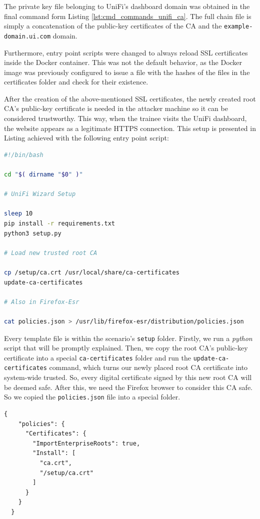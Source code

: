 The private key file belonging to UniFi's dashboard domain was obtained in the final command form Listing \ref{lst:cmd_commands_unifi_ca}. The full chain file is simply a concatenation of the public-key certificates of the CA and the \texttt{example-domain.ui.com} domain. 

Furthermore, entry point scripts were changed to always reload SSL certificates inside the Docker container. This was not the default behavior, as the Docker image was previously configured to issue a file with the hashes of the files in the certificates folder and check for their existence.


After the creation of the above-mentioned SSL certificates, the newly created root CA's public-key certificate is needed in the attacker machine so it can be considered trustworthy. This way, when the trainee visits the UniFi dashboard, the website appears as a legitimate HTTPS connection. This setup is presented in Listing  achieved with the following entry point script:

\begin{lstlisting}[language=bash,caption=Entrypoint Bash Script.,numbers=none,label={lst:log4j_entrypoint_script}]
#!/bin/bash

cd "$( dirname "$0" )"

# UniFi Wizard Setup 

sleep 10
pip install -r requirements.txt
python3 setup.py

# Load new trusted root CA

cp /setup/ca.crt /usr/local/share/ca-certificates
update-ca-certificates

# Also in Firefox-Esr

cat policies.json > /usr/lib/firefox-esr/distribution/policies.json
\end{lstlisting}

Every template file is within the scenario's \texttt{setup} folder. Firstly, we run a \textit{python} script that will be promptly explained. Then, we copy the root CA's public-key certificate into a special \texttt{ca-certificates} folder and run the \texttt{update-ca-certificates} command, which turns our newly placed root CA certificate into system-wide trusted. So, every digital certificate signed by this new root CA will be deemed safe. After this, we need the Firefox browser to consider this CA safe. So we copied the \texttt{policies.json} file into a special folder.

\begin{lstlisting}[caption=Firefox's Policies File.,numbers=none,label={lst:firefox_json_policies}]
{
    "policies": {
      "Certificates": {
        "ImportEnterpriseRoots": true,
        "Install": [
          "ca.crt",
          "/setup/ca.crt"
        ]
      }
    }
  }
\end{lstlisting}

